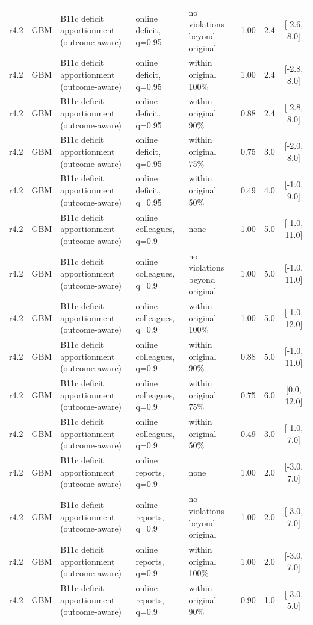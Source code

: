 \begin{longtable}{lllp{4.2cm}p{3.4cm}ccc}
r4.2 & GBM & B11c deficit apportionment (outcome-aware) & online deficit, q=0.95 & no violations beyond original & 1.00 & 2.4 & [-2.6, 8.0] \\
r4.2 & GBM & B11c deficit apportionment (outcome-aware) & online deficit, q=0.95 & within original 100\% & 1.00 & 2.4 & [-2.8, 8.0] \\
r4.2 & GBM & B11c deficit apportionment (outcome-aware) & online deficit, q=0.95 & within original 90\% & 0.88 & 2.4 & [-2.8, 8.0] \\
r4.2 & GBM & B11c deficit apportionment (outcome-aware) & online deficit, q=0.95 & within original 75\% & 0.75 & 3.0 & [-2.0, 8.0] \\
r4.2 & GBM & B11c deficit apportionment (outcome-aware) & online deficit, q=0.95 & within original 50\% & 0.49 & 4.0 & [-1.0, 9.0] \\
r4.2 & GBM & B11c deficit apportionment (outcome-aware) & online colleagues, q=0.9 & none & 1.00 & 5.0 & [-1.0, 11.0] \\
r4.2 & GBM & B11c deficit apportionment (outcome-aware) & online colleagues, q=0.9 & no violations beyond original & 1.00 & 5.0 & [-1.0, 11.0] \\
r4.2 & GBM & B11c deficit apportionment (outcome-aware) & online colleagues, q=0.9 & within original 100\% & 1.00 & 5.0 & [-1.0, 12.0] \\
r4.2 & GBM & B11c deficit apportionment (outcome-aware) & online colleagues, q=0.9 & within original 90\% & 0.88 & 5.0 & [-1.0, 11.0] \\
r4.2 & GBM & B11c deficit apportionment (outcome-aware) & online colleagues, q=0.9 & within original 75\% & 0.75 & 6.0 & [0.0, 12.0] \\
r4.2 & GBM & B11c deficit apportionment (outcome-aware) & online colleagues, q=0.9 & within original 50\% & 0.49 & 3.0 & [-1.0, 7.0] \\
r4.2 & GBM & B11c deficit apportionment (outcome-aware) & online reports, q=0.9 & none & 1.00 & 2.0 & [-3.0, 7.0] \\
r4.2 & GBM & B11c deficit apportionment (outcome-aware) & online reports, q=0.9 & no violations beyond original & 1.00 & 2.0 & [-3.0, 7.0] \\
r4.2 & GBM & B11c deficit apportionment (outcome-aware) & online reports, q=0.9 & within original 100\% & 1.00 & 2.0 & [-3.0, 7.0] \\
r4.2 & GBM & B11c deficit apportionment (outcome-aware) & online reports, q=0.9 & within original 90\% & 0.90 & 1.0 & [-3.0, 5.0] \\

\end{longtable}
